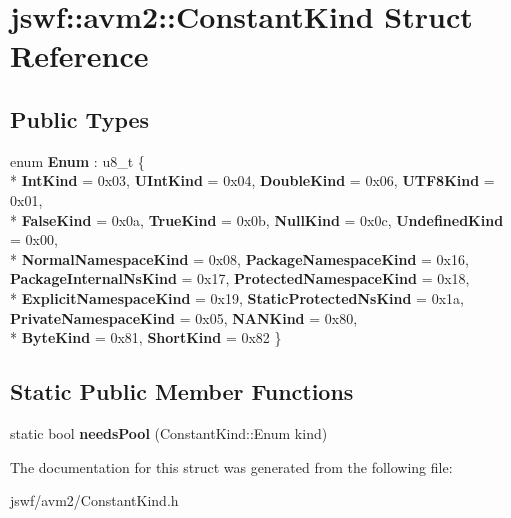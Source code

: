 \hypertarget{structjswf_1_1avm2_1_1_constant_kind}{\section{jswf\+:\+:avm2\+:\+:Constant\+Kind Struct Reference}
\label{structjswf_1_1avm2_1_1_constant_kind}
}
\subsection*{Public Types}
\begin{DoxyCompactItemize}
\item 
\hypertarget{structjswf_1_1avm2_1_1_constant_kind_a08c93a1e1d9466df91b4b9b70e0cc8b7}{enum {\bfseries Enum} \+: u8\+\_\+t \{ \\*
{\bfseries Int\+Kind} = 0x03, 
{\bfseries U\+Int\+Kind} = 0x04, 
{\bfseries Double\+Kind} = 0x06, 
{\bfseries U\+T\+F8\+Kind} = 0x01, 
\\*
{\bfseries False\+Kind} = 0x0a, 
{\bfseries True\+Kind} = 0x0b, 
{\bfseries Null\+Kind} = 0x0c, 
{\bfseries Undefined\+Kind} = 0x00, 
\\*
{\bfseries Normal\+Namespace\+Kind} = 0x08, 
{\bfseries Package\+Namespace\+Kind} = 0x16, 
{\bfseries Package\+Internal\+Ns\+Kind} = 0x17, 
{\bfseries Protected\+Namespace\+Kind} = 0x18, 
\\*
{\bfseries Explicit\+Namespace\+Kind} = 0x19, 
{\bfseries Static\+Protected\+Ns\+Kind} = 0x1a, 
{\bfseries Private\+Namespace\+Kind} = 0x05, 
{\bfseries N\+A\+N\+Kind} = 0x80, 
\\*
{\bfseries Byte\+Kind} = 0x81, 
{\bfseries Short\+Kind} = 0x82
 \}}\label{structjswf_1_1avm2_1_1_constant_kind_a08c93a1e1d9466df91b4b9b70e0cc8b7}

\end{DoxyCompactItemize}
\subsection*{Static Public Member Functions}
\begin{DoxyCompactItemize}
\item 
\hypertarget{structjswf_1_1avm2_1_1_constant_kind_a6c6a040fc9d7e1fd5cc0c296641fc5ce}{static bool {\bfseries needs\+Pool} (Constant\+Kind\+::\+Enum kind)}\label{structjswf_1_1avm2_1_1_constant_kind_a6c6a040fc9d7e1fd5cc0c296641fc5ce}

\end{DoxyCompactItemize}


The documentation for this struct was generated from the following file\+:\begin{DoxyCompactItemize}
\item 
jswf/avm2/Constant\+Kind.\+h\end{DoxyCompactItemize}
